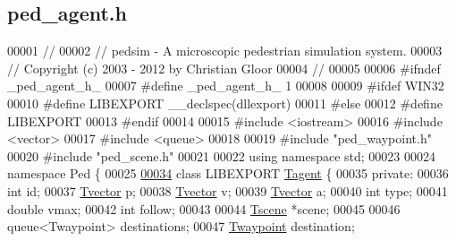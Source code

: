 \hypertarget{ped__agent_8h_source}{
\subsection{ped\_\-agent.h}
}

\begin{DoxyCode}
00001 \textcolor{comment}{//}
00002 \textcolor{comment}{// pedsim - A microscopic pedestrian simulation system. }
00003 \textcolor{comment}{// Copyright (c) 2003 - 2012 by Christian Gloor}
00004 \textcolor{comment}{//                              }
00005 
00006 \textcolor{preprocessor}{#ifndef \_ped\_agent\_h\_}
00007 \textcolor{preprocessor}{}\textcolor{preprocessor}{#define \_ped\_agent\_h\_ 1}
00008 \textcolor{preprocessor}{}
00009 \textcolor{preprocessor}{#ifdef WIN32}
00010 \textcolor{preprocessor}{}\textcolor{preprocessor}{#define LIBEXPORT \_\_declspec(dllexport)}
00011 \textcolor{preprocessor}{}\textcolor{preprocessor}{#else}
00012 \textcolor{preprocessor}{}\textcolor{preprocessor}{#define LIBEXPORT}
00013 \textcolor{preprocessor}{}\textcolor{preprocessor}{#endif}
00014 \textcolor{preprocessor}{}
00015 \textcolor{preprocessor}{#include <iostream>}
00016 \textcolor{preprocessor}{#include <vector>}
00017 \textcolor{preprocessor}{#include <queue>}
00018 
00019 \textcolor{preprocessor}{#include "ped\_waypoint.h"}
00020 \textcolor{preprocessor}{#include "ped\_scene.h"}
00021 
00022 \textcolor{keyword}{using namespace }std;
00023 
00024 \textcolor{keyword}{namespace }Ped \{
00025 
\hypertarget{ped__agent_8h_source_l00034}{}\hyperlink{classPed_1_1Tagent}{00034}         \textcolor{keyword}{class }LIBEXPORT \hyperlink{classPed_1_1Tagent}{Tagent} \{
00035         \textcolor{keyword}{private}:
00036                 \textcolor{keywordtype}{int} id;                                           
00037                 \hyperlink{classPed_1_1Tvector}{Tvector} p;                                        
00038                 \hyperlink{classPed_1_1Tvector}{Tvector} v;                                        
00039                 \hyperlink{classPed_1_1Tvector}{Tvector} a;                                        
00040                 \textcolor{keywordtype}{int} type;                                         
00041                 \textcolor{keywordtype}{double} vmax;                                      
00042                 \textcolor{keywordtype}{int} follow;
00043 
00044                 \hyperlink{classPed_1_1Tscene}{Tscene} *scene;
00045                 
00046                 queue<Twaypoint> destinations;                    
00047                 \hyperlink{classPed_1_1Twaypoint}{Twaypoint} destination;                            

\end{DoxyCode}
